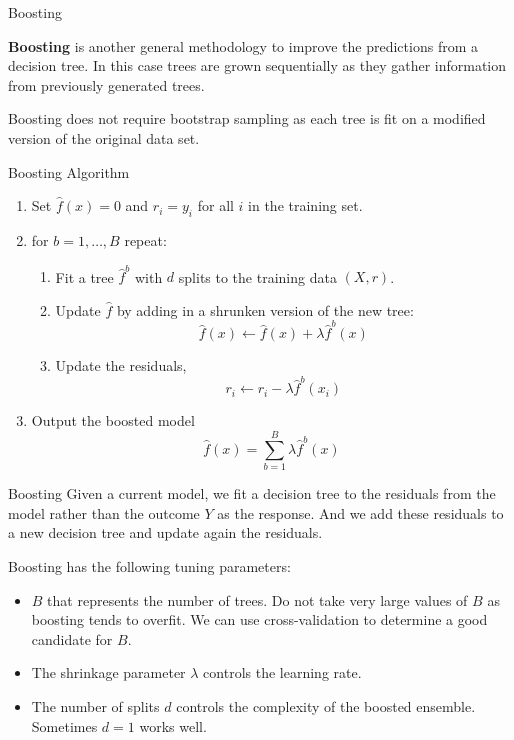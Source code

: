 \documentclass{beamer}
\begin{document}
\begin{frame}{Boosting}
	
	{\bf Boosting} is another general methodology to improve the predictions from a decision tree. 
	In this case trees are grown sequentially as they gather information from previously generated trees. 
	
 Boosting does not require bootstrap sampling as each tree is fit on a modified version of the original data set.
 
 
	
\end{frame}

\begin{frame}{Boosting Algorithm}
	\begin{enumerate}
		\item Set $\hat{f}(x)=0$ and $r_i=y_i$ for all $i$ in the training set. 
		\item for $b=1,\ldots, B$ repeat:
		\begin{enumerate}
			\item Fit a tree $\hat{f}^b$ with $d$ splits to the training data $(X,r)$.
			\item Update $\hat{f}$ by adding in a shrunken version of the new tree:
			\begin{equation*}
				\hat{f}(x) \leftarrow \hat{f}(x)+ \lambda \hat{f}^b (x)
			\end{equation*}
		\item Update the residuals,
		\begin{equation*}
			r_i \leftarrow r_i - \lambda \hat{f}^b(x_i)
		\end{equation*}
		\end{enumerate}
	\item Output the boosted model
	\begin{equation}
		\hat{f}(x)=\sum_{b=1}^B \lambda \hat{f}^b(x)
	\end{equation}
	\end{enumerate}
\end{frame}

\begin{frame}{Boosting}
	Given a current model, we fit a decision tree to the residuals from the model rather than the outcome $Y$ as the response. And we add these residuals to a new decision tree and update again the residuals. 
	
	Boosting has the following tuning parameters:
	
	\begin{itemize}
		\item $B$ that represents the number of trees. Do not take very large values of $B$ as boosting tends to overfit. We can use cross-validation to determine a good candidate for $B$.
		\item The shrinkage parameter $\lambda$ controls the learning rate. 
		\item The number of splits $d$ controls the complexity of the boosted ensemble. Sometimes $d=1$ works well. 
	\end{itemize} \end{frame}
\end{document}
